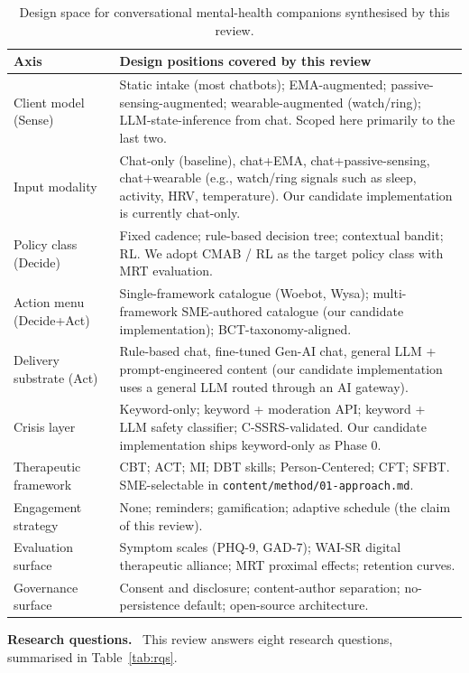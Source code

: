 \documentclass[10pt,conference]{article}
\newcommand{\tabref}[1]{Table~\ref{#1}}
\renewcommand{\paragraph}[1]{\smallskip\par\noindent\textbf{#1}~\ignorespaces}
\begin{document}
\begin{table}[t]
\small
\begin{tabularx}{\textwidth}{l X}
\toprule
\textbf{Axis} & \textbf{Design positions covered by this review} \\
\midrule
Client model (Sense) & Static intake (most chatbots); EMA-augmented; passive-sensing-augmented; wearable-augmented (watch/ring); LLM-state-inference from chat. Scoped here primarily to the last two. \\
Input modality & Chat-only (baseline), chat+EMA, chat+passive-sensing, chat+wearable (e.g., watch/ring signals such as sleep, activity, HRV, temperature). Our candidate implementation is currently chat-only. \\
Policy class (Decide) & Fixed cadence; rule-based decision tree; contextual bandit; RL. We adopt CMAB / RL as the target policy class with MRT evaluation. \\
Action menu (Decide+Act) & Single-framework catalogue (Woebot, Wysa); multi-framework SME-authored catalogue (our candidate implementation); BCT-taxonomy-aligned. \\
Delivery substrate (Act) & Rule-based chat, fine-tuned Gen-AI chat, general LLM + prompt-engineered content (our candidate implementation uses a general LLM routed through an AI gateway). \\
Crisis layer & Keyword-only; keyword + moderation API; keyword + LLM safety classifier; C-SSRS-validated. Our candidate implementation ships keyword-only as Phase 0. \\
Therapeutic framework & CBT; ACT; MI; DBT skills; Person-Centered; CFT; SFBT. SME-selectable in \texttt{content/method/01-approach.md}. \\
Engagement strategy & None; reminders; gamification; adaptive schedule (the claim of this review). \\
Evaluation surface & Symptom scales (PHQ-9, GAD-7); WAI-SR digital therapeutic alliance; MRT proximal effects; retention curves. \\
Governance surface & Consent and disclosure; content-author separation; no-persistence default; open-source architecture. \\
\bottomrule
\end{tabularx}
\caption{Design space for conversational mental-health companions synthesised by this review.}
\label{tab:taxonomy}
\end{table}

\paragraph{Research questions.}
This review answers eight research questions, summarised in
\tabref{tab:rqs}.
\end{document}

